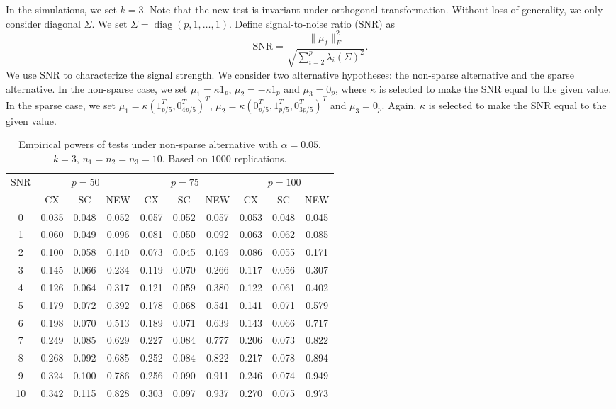 \documentclass[review]{elsarticle}
\DeclareMathOperator{\mytr}{tr}
\DeclareMathOperator{\mydiag}{diag}
\theoremstyle{plain}
\theoremstyle{definition}
\theoremstyle{remark}
\begin{document}
In the simulations, we set $k=3$.
Note that the new test is invariant under orthogonal transformation.
Without loss of generality, we only consider diagonal $\Sigma$.
We set $\Sigma=\mydiag(p,1,\ldots,1)$.
Define signal-to-noise ratio (SNR) as
$$
\textrm{SNR}=\frac{\|\mu_f\|_F^2}{\sqrt{\sum_{i=2}^{p}\lambda_i(\Sigma)^2}}.
$$
We use SNR to characterize the signal strength.
We consider two alternative hypotheses: the non-sparse alternative and the sparse alternative.
In the non-sparse case, we set $\mu_1=\kappa 1_p$, $\mu_2=-\kappa 1_p$ and $\mu_3=0_p$, where $\kappa$ is selected to make the SNR equal to the given value.
In the sparse case, we set $\mu_1=\kappa (1_{p/5}^T,0_{4p/5}^T)^T$, $\mu_2=\kappa (0_{p/5}^T, 1_{p/5}^T,0_{3p/5}^T)^T$ and $\mu_3=0_p$. Again, $\kappa$ is selected to make the SNR equal to the given value.



\begin{table}[!hbp]
    \caption{Empirical powers of tests under non-sparse alternative with $\alpha=0.05$, $k=3$, $n_1=n_2=n_3=10$. Based on $1000$ replications.}
    \centering
    \begin{tabular}{*{10}{c}}
    \toprule
    \multirow{2}{*}{SNR} &\multicolumn{3}{c}{$p=50$}&\multicolumn{3}{c}{$p=75$}&\multicolumn{3}{c}{$p=100$} \\
        \cmidrule(r){2-4}\cmidrule(r){5-7}\cmidrule(r){8-10}
        & CX & SC & NEW & CX &SC &NEW &CX & SC & NEW\\
    \midrule
0 & 0.035 & 0.048 & 0.052 & 0.057 & 0.052 & 0.057 & 0.053 & 0.048 & 0.045 \\ 
1 & 0.060 & 0.049 & 0.096 & 0.081 & 0.050 & 0.092 & 0.063 & 0.062 & 0.085 \\ 
2 & 0.100 & 0.058 & 0.140 & 0.073 & 0.045 & 0.169 & 0.086 & 0.055 & 0.171 \\ 
3 & 0.145 & 0.066 & 0.234 & 0.119 & 0.070 & 0.266 & 0.117 & 0.056 & 0.307 \\ 
4 & 0.126 & 0.064 & 0.317 & 0.121 & 0.059 & 0.380 & 0.122 & 0.061 & 0.402 \\ 
5 & 0.179 & 0.072 & 0.392 & 0.178 & 0.068 & 0.541 & 0.141 & 0.071 & 0.579 \\ 
6 & 0.198 & 0.070 & 0.513 & 0.189 & 0.071 & 0.639 & 0.143 & 0.066 & 0.717 \\ 
7 & 0.249 & 0.085 & 0.629 & 0.227 & 0.084 & 0.777 & 0.206 & 0.073 & 0.822 \\ 
8 & 0.268 & 0.092 & 0.685 & 0.252 & 0.084 & 0.822 & 0.217 & 0.078 & 0.894 \\ 
9 & 0.324 & 0.100 & 0.786 & 0.256 & 0.090 & 0.911 & 0.246 & 0.074 & 0.949 \\ 
10 & 0.342 & 0.115 & 0.828 & 0.303 & 0.097 & 0.937 & 0.270 & 0.075 & 0.973 \\ 
\bottomrule
\end{tabular}
\end{table}
\end{document}
